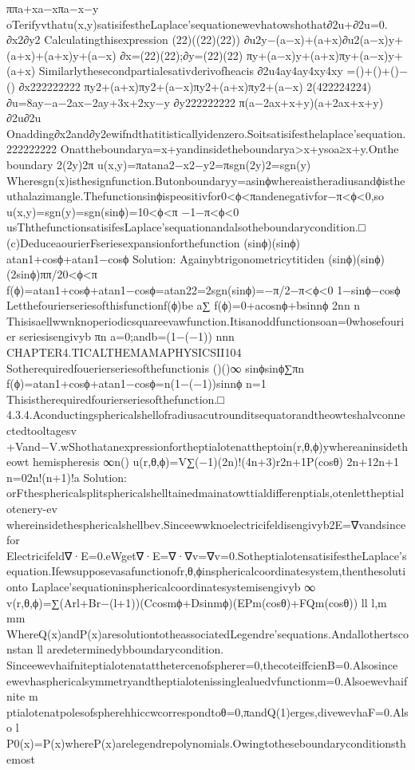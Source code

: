 {ππa+xa−xπa−x−y
oTerifyvthatu(x,y)satisifestheLaplace’sequationewevhatowshothat∂2u+∂2u=0.
∂x2∂y2
Calculatingthisexpression
(22)((22)(22))
∂u2y−(a−x)+(a+x)∂u2(a−x)y+(a+x)+(a+x)y+(a−x)
∂x=(22)(22);∂y=(22)(22)
πy+(a−x)y+(a+x)πy+(a−x)y+(a+x)
Similarlythesecondpartialesativderivofheacis
∂2u4ay4ay4xy4xy
=()+()+()−()
∂x222222222
πy2+(a+x)πy2+(a−x)πy2+(a+x)πy2+(a−x)
2(422224224)
∂u=8ay−a−2ax−2ay+3x+2xy−y
∂y222222222
π(a−2ax+x+y)(a+2ax+x+y)
∂2u∂2u
Onadding∂x2and∂y2ewifndthatitisticallyidenzero.Soitsatisifesthelaplace’sequation.
222222222
Onattheboundarya=x+yandinsidetheboundarya>x+ysoa≥x+y.Onthe
boundary
2(2y)2π
u(x,y)=πatana2−x2−y2=πsgn(2y)2=sgn(y)
Wheresgn(x)isthesignfunction.Butonboundaryy=asinϕwhereaistheradiusandϕisthe
uthalazimangle.Thefunctionsinϕispeositivfor0<ϕ<πandenegativfor−π<ϕ<0,so
u(x,y)=sgn(y)=sgn(sinϕ)={10<ϕ<π
−1−π<ϕ<0
usThthefunctionsatisifesLaplace’sequationandalsotheboundarycondition.□
(c)DeduceaourierFseriesexpansionforthefunction
(sinϕ)(sinϕ)
atan1+cosϕ+atan1−cosϕ
Solution:
Againybtrigonometricytitiden
(sinϕ)(sinϕ)(2sinϕ)π{π/20<ϕ<π
f(ϕ)=atan1+cosϕ+atan1−cosϕ=atan22=2sgn(sinϕ)=−π/2−π<ϕ<0
1−sinϕ−cosϕ
Letthefourierseriesofthisfunctionf(ϕ)be
a∑
f(ϕ)=0+acosnϕ+bsinnϕ
2nn
n
Thisisaellwwnknoperiodicsquareevawfunction.Itisanoddfunctionsoan=0whosefourier
seriesisengivyb
πn
a=0;andb=(1−(−1))
nnn
CHAPTER4.TICALTHEMAMAPHYSICSII104
Sotherequiredfouerierseriesofthefunctionis
()()∞
sinϕsinϕ∑πn
f(ϕ)=atan1+cosϕ+atan1−cosϕ=n(1−(−1))sinnϕ
n=1
Thisistherequiredfourierseriesofthefunction.□
4.3.4.Aconductingsphericalshellofradiusacutrounditsequatorandtheowteshalvconnectedtooltagesv
+Vand−V.wShothatanexpressionfortheptialotenattheptoin(r,θ,ϕ)ywhereaninsidetheowt
hemispheresis
∞n()
u(r,θ,ϕ)=V∑(−1)(2n)!(4n+3)r2n+1P(cosθ)
2n+12n+1
n=02n!(n+1)!a
Solution:
orFthesphericalsplitsphericalshelltainedmainatowttialdifferenptials,otenlettheptialotenery-ev
whereinsidethesphericalshellbev.Sinceewwknoelectricifeldisengivyb2E=∇vandsincefor
Electricifeld∇·E=0.eWget∇·E=∇·∇v=∇v=0.SotheptialotensatisifestheLaplace’s
equation.Ifewsupposevasafunctionofr,θ,ϕinsphericalcoordinatesystem,thenthesolutionto
Laplace’sequationinsphericalcoordinatesystemisengivyb
∞
v(r,θ,ϕ)=∑(Arl+Br−(l+1))(Ccosmϕ+Dsinmϕ)(EPm(cosθ)+FQm(cosθ))
ll
l,m
mm
WhereQ(x)andP(x)aresolutiontotheassociatedLegendre’sequations.Andallothertsconstan
ll
aredeterminedybboundarycondition.
Sinceewevhaifniteptialotenatatthetercenofspherer=0,thecoteiffcienB=0.Alsosince
ewevhasphericalsymmetryandtheptialotenissinglealuedvfunctionm=0.Alsoewevhaifnite
m
ptialotenatpolesofspherehhiccwcorrespondtoθ={0,π}andQ(1)erges,divewevhaF=0.Also
l
P0(x)=P(x)whereP(x)arelegendrepolynomials.Owingtotheseboundaryconditionsthemost
}}}
